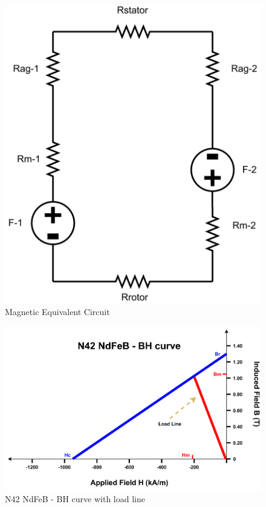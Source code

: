 \documentclass{article}
\begin{document}
\begin{figure}[h!]
\centering
\includegraphics[scale=0.5]{Figures/MagneticCircuit.png}
\caption{Magnetic Equivalent Circuit }
\label{fig:MagneticCircuit}
\end{figure}
\begin{figure}[h!]
\centering
\includegraphics[scale=0.8]{Figures/BHCurve.png}
\caption{N42 NdFeB - BH curve with load line}
\label{fig:BHCurve}
\end{figure}
\end{document}
